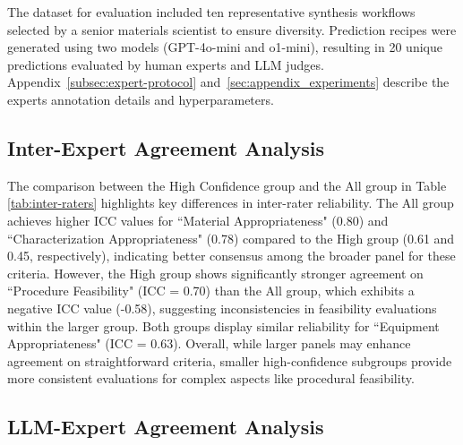 The dataset for evaluation included ten representative synthesis workflows selected by a senior materials scientist to ensure diversity. Prediction recipes were generated using two models (GPT-4o-mini and o1-mini), resulting in 20 unique predictions evaluated by human experts and LLM judges. Appendix~\ref{subsec:expert-protocol} and~\ref{sec:appendix_experiments} describe the experts annotation details and hyperparameters.

\subsection{Inter-Expert Agreement Analysis}
\label{subsec:inter_rater_analysis}


The comparison between the High Confidence group and the All group in Table \ref{tab:inter-raters} highlights key differences in inter-rater reliability. The All group achieves higher ICC values for ``Material Appropriateness" (0.80) and ``Characterization Appropriateness" (0.78) compared to the High group (0.61 and 0.45, respectively), indicating better consensus among the broader panel for these criteria. However, the High group shows significantly stronger agreement on ``Procedure Feasibility" (ICC = 0.70) than the All group, which exhibits a negative ICC value (-0.58), suggesting inconsistencies in feasibility evaluations within the larger group. Both groups display similar reliability for ``Equipment Appropriateness" (ICC = 0.63). Overall, while larger panels may enhance agreement on straightforward criteria, smaller high-confidence subgroups provide more consistent evaluations for complex aspects like procedural feasibility.

\subsection{LLM-Expert Agreement Analysis}
\label{subsec:llm_expert_analysis}


